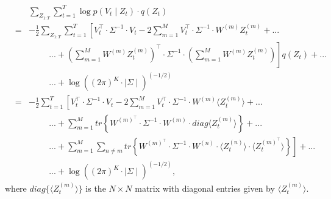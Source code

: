\documentclass{amsart}
\begin{document}
\begin{eqnarray*}
&&\sum_{Z_{1:T}}\sum_{t=1}^T\log p(V_t\mid Z_t)\cdot q(Z_t) \\
& = & 
-\frac{1}{2}\sum_{Z_{1:T}}\sum_{t=1}^T\left[V_t^\intercal\cdot \Sigma^{-1}\cdot 
V_t - 2\sum_{m=1}^M V_t^\intercal \cdot \Sigma^{-1}\cdot 
W^{(m)}Z_t^{(m)} \right.+...\\
&&\hspace{1cm}...+\left.\left(\sum_{m=1}^MW^{(m)}Z_t^{(m)}\right)^\intercal\cdot 
\Sigma^{-1}\cdot 
\left(\sum_{m=1}^MW^{(m)}Z_t^{(m)}\right)
\right]q(Z_t)+...\\
&&\hspace{1cm}...+ \log \left((2\pi)^K\cdot\mid 
\Sigma\mid\right)^{(-1/2)}\\
& = & 
-\frac{1}{2}\sum_{t=1}^T\left[V_t^\intercal\cdot \Sigma^{-1}\cdot 
V_t - 2\sum_{m=1}^M V_t^\intercal \cdot \Sigma^{-1}\cdot 
W^{(m)}\langle Z_t^{(m)} \rangle\right.+...\\
&&\hspace{1cm}...+\left.\sum_{m=1}^M tr\left\{W^{(m)^\intercal}\cdot \Sigma^{-1}\cdot 
W^{(m)}\cdot diag\langle Z_t^{(m)}\rangle\right\}\right.+...\\
&&\hspace{1cm}...+\left.\sum_{m=1}^M\sum_{n\neq m} 
tr\left\{W^{(m)^\intercal}\cdot \Sigma^{-1}\cdot W^{(n)}\cdot \langle 
Z_t^{(n)}\rangle\cdot \langle 
Z_t^{(m)^\intercal}\rangle\right\}\right]+...\\
&&\hspace{1cm}...+ \log \left((2\pi)^K\cdot\mid 
\Sigma\mid\right)^{(-1/2)},
\end{eqnarray*}
where $diag\{\langle Z_t^{(m)}\rangle\}$ is the $N\times N$ matrix with diagonal entries 
given by $\langle Z_t^{(m)}\rangle$.
\end{document}
